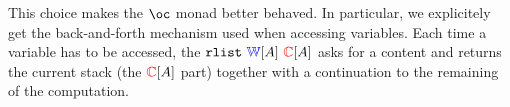 \documentclass[a4paper]{article}
\newcommand{\wproof}[1]{{\color{blue}\mathbb{W}}[#1]}
\newcommand{\cproof}[1]{{\color{red}\mathbb{C}}[#1]}
\begin{document}
This choice makes the $\oc$ monad better behaved. In particular, we explicitely 
get the back-and-forth mechanism used when accessing variables. Each time a
variable has to be accessed, the $\mathtt{rlist}\ \wproof{A}\ \cproof{A}$ asks
for a content and returns the current stack (the $\cproof{A}$ part) together
with a continuation to the remaining of the computation.
\end{document}
